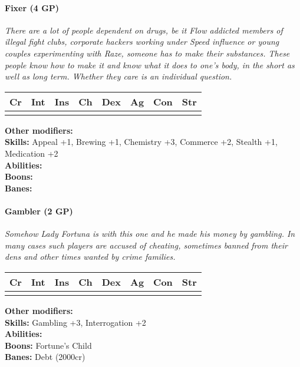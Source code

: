 \paragraph*{Fixer (4 GP)}
\textit{There are a lot of people dependent on drugs, be it Flow addicted members of illegal fight clubs, corporate hackers working under Speed influence or young couples experimenting with Raze, someone has to make their substances. These people know how to make it and know what it does to one's body, in the short as well as long term. Whether they care is an individual question.}\par
\begin{tabular}{|l|l|l|l|l|l|l|l|}
	\hline
	Cr & Int & Ins & Ch & Dex & Ag & Con & Str \\ \hline
	&  &  &  &  &  &  &  \\ \hline
\end{tabular}\par
\noindent\textbf{Other modifiers:} \\
\textbf{Skills:} Appeal +1,
Brewing +1,
Chemistry +3,
Commerce +2,
Stealth +1,
Medication +2\\
\textbf{Abilities:} \\
\textbf{Boons:} \\
\textbf{Banes:} \\

\hrulefill
\paragraph*{Gambler (2 GP)}
\textit{Somehow Lady Fortuna is with this one and he made his money by gambling. In many cases such players are accused of cheating, sometimes banned from their dens and other times wanted by crime families.}\par
\begin{tabular}{|l|l|l|l|l|l|l|l|}
	\hline
	Cr & Int & Ins & Ch & Dex & Ag & Con & Str \\ \hline
	&  &  &  &  &  &  &  \\ \hline
\end{tabular}\par
\noindent\textbf{Other modifiers:} \\
\textbf{Skills:} Gambling +3,
Interrogation +2\\
\textbf{Abilities:} \\
\textbf{Boons:} Fortune's Child\\
\textbf{Banes:} Debt (2000cr)\\

